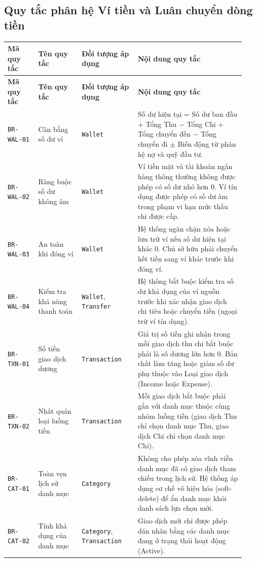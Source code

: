 \documentclass[11pt,a4paper]{article}
\newcommand{\code}[1]{\texttt{#1}}
\newcommand{\lthead}[1]{%
  \hline#1\\\hline\endfirsthead
  \hline#1\\\hline\endhead
}
\newenvironment{smalltable}{\begingroup\footnotesize\renewcommand{\arraystretch}{1.25}\setlength{\tabcolsep}{3pt}}{\endgroup}
\begin{document}
\subsection{Quy tắc phân hệ Ví tiền và Luân chuyển dòng tiền}

\begin{smalltable}
\begin{longtable}{|L{0.12\linewidth}|L{0.17\linewidth}|L{0.22\linewidth}|L{0.42\linewidth}|}
\lthead{\textbf{Mã quy tắc} & \textbf{Tên quy tắc} & \textbf{Đối tượng áp dụng} & \textbf{Nội dung quy tắc}}
\code{BR-WAL-01} & Cân bằng số dư ví & \code{Wallet} & Số dư hiện tại = Số dư ban đầu + Tổng Thu $-$ Tổng Chi + Tổng chuyển đến $-$ Tổng chuyển đi $\pm$ Biến động từ phân hệ nợ và quỹ đầu tư. \\ \hline
\code{BR-WAL-02} & Ràng buộc số dư không âm & \code{Wallet} & Ví tiền mặt và tài khoản ngân hàng thông thường không được phép có số dư nhỏ hơn 0. Ví tín dụng được phép có số dư âm trong phạm vi hạn mức thấu chi được cấp. \\ \hline
\code{BR-WAL-03} & An toàn khi đóng ví & \code{Wallet} & Hệ thống ngăn chặn xóa hoặc lưu trữ ví nếu số dư hiện tại khác 0. Chủ sở hữu phải chuyển hết tiền sang ví khác trước khi đóng ví. \\ \hline
\code{BR-WAL-04} & Kiểm tra khả năng thanh toán & \code{Wallet}, \code{Transfer} & Hệ thống bắt buộc kiểm tra số dư khả dụng của ví nguồn trước khi xác nhận giao dịch chi tiêu hoặc chuyển tiền (ngoại trừ ví tín dụng). \\ \hline
\code{BR-TXN-01} & Số tiền giao dịch dương & \code{Transaction} & Giá trị số tiền ghi nhận trong mỗi giao dịch thu chi bắt buộc phải là số dương lớn hơn 0. Bản chất làm tăng hoặc giảm số dư phụ thuộc vào Loại giao dịch (Income hoặc Expense). \\ \hline
\code{BR-TXN-02} & Nhất quán loại luồng tiền & \code{Transaction} & Mỗi giao dịch bắt buộc phải gắn với danh mục thuộc cùng nhóm luồng tiền (giao dịch Thu chỉ chọn danh mục Thu, giao dịch Chi chỉ chọn danh mục Chi). \\ \hline
\code{BR-CAT-01} & Toàn vẹn lịch sử danh mục & \code{Category} & Không cho phép xóa vĩnh viễn danh mục đã có giao dịch tham chiếu trong lịch sử. Hệ thống áp dụng cơ chế vô hiệu hóa (soft-delete) để ẩn danh mục khỏi danh sách lựa chọn mới. \\ \hline
\code{BR-CAT-02} & Tính khả dụng của danh mục & \code{Category}, \code{Transaction} & Giao dịch mới chỉ được phép dán nhãn bằng các danh mục đang ở trạng thái hoạt động (Active). \\ \hline

\end{longtable}
\end{smalltable}
\end{document}
